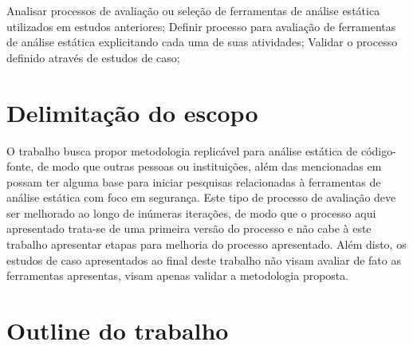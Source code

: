 Analisar processos de avaliação ou seleção de ferramentas de análise estática utilizados em estudos anteriores;
Definir processo para avaliação de ferramentas de análise estática explicitando cada uma de suas atividades;
Validar o processo definido através de estudos de caso;

\section{Delimitação do escopo}

O trabalho busca propor metodologia replicável para análise estática de código-fonte, de modo que outras pessoas ou instituições, além das mencionadas em  possam ter alguma base para iniciar pesquisas relacionadas à ferramentas de análise estática com foco em segurança. Este tipo de processo de avaliação deve ser melhorado ao longo de inúmeras iterações, de modo que o processo aqui apresentado trata-se de uma primeira versão do processo e não cabe à este trabalho apresentar etapas para melhoria do processo apresentado. Além disto, os estudos de caso apresentados ao final deste trabalho não visam avaliar de fato as ferramentas apresentas, visam apenas validar a metodologia proposta.

\section{Outline do trabalho}

